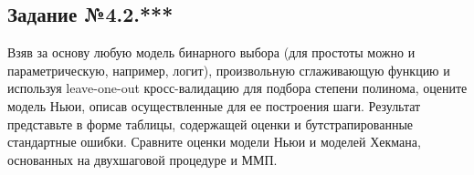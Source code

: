 \documentclass[a4paper,12pt]{article}
\begin{document}
\subsection{Задание №4.2.***} Взяв за основу любую модель бинарного выбора (для простоты можно и параметрическую, например, логит), произвольную сглаживающую функцию и используя leave-one-out кросс-валидацию для подбора степени полинома, оцените модель Ньюи, описав осуществленные для ее построения шаги. Результат представьте в форме таблицы, содержащей оценки и бутстрапированные стандартные ошибки. Сравните оценки модели Ньюи и моделей Хекмана, основанных на двухшаговой процедуре и ММП.

	
\end{document}
